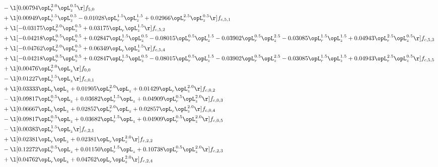 \begin{alignat}{2}
& - \l[  0.00794 \opL_r^{2.0} \opL_z^{0.5}  \r] f_{5,0} \nonumber \\ 
& + \l[  0.00949 \opL_r^{1.5} \opL_z^{0.5}   -0.01028 \opL_r^{1.5} \opL_z^{1.5} +  0.02966 \opL_r^{2.5} \opL_z^{0.5}  \r] f_{c,5,1} \nonumber \\ 
& + \l[  -0.03175 \opL_r^{2.0} \opL_z^{0.5} +  0.03175 \opL_r \opL_z^{1.5}  \r] f_{c,5,2} \nonumber \\ 
& + \l[  -0.04218 \opL_r^{0.5} \opL_z^{0.5} +  0.02847 \opL_r^{1.5} \opL_z^{0.5}   -0.08015 \opL_r^{0.5} \opL_z^{1.5}   -0.03902 \opL_r^{0.5} \opL_z^{2.5}   -0.03085 \opL_r^{1.5} \opL_z^{1.5} +  0.04943 \opL_r^{2.5} \opL_z^{0.5}  \r] f_{c,5,3} \nonumber \\ 
& + \l[  -0.04762 \opL_r^{2.0} \opL_z^{0.5} +  0.06349 \opL_r \opL_z^{1.5}  \r] f_{c,5,4} \nonumber \\ 
& + \l[  -0.04218 \opL_r^{0.5} \opL_z^{0.5} +  0.02847 \opL_r^{1.5} \opL_z^{0.5}   -0.08015 \opL_r^{0.5} \opL_z^{1.5}   -0.03902 \opL_r^{0.5} \opL_z^{2.5}   -0.03085 \opL_r^{1.5} \opL_z^{1.5} +  0.04943 \opL_r^{2.5} \opL_z^{0.5}  \r] f_{c,5,5} \nonumber \\ 
& + \l[  0.00476 \opL_r^{2.0} \opL_z  \r] f_{0,0} \nonumber \\ 
& - \l[  0.01227 \opL_r^{1.5} \opL_z  \r] f_{c,0,1} \nonumber \\ 
& + \l[  0.03333 \opL_r \opL_z +  0.01905 \opL_r^{2.0} \opL_z +  0.01429 \opL_r \opL_z^{2.0}  \r] f_{c,0,2} \nonumber \\ 
& - \l[  0.09817 \opL_r^{0.5} \opL_z +  0.03682 \opL_r^{1.5} \opL_z +  0.04909 \opL_r^{0.5} \opL_z^{2.0}  \r] f_{c,0,3} \nonumber \\ 
& + \l[  0.06667 \opL_r \opL_z +  0.02857 \opL_r^{2.0} \opL_z +  0.02857 \opL_r \opL_z^{2.0}  \r] f_{c,0,4} \nonumber \\ 
& - \l[  0.09817 \opL_r^{0.5} \opL_z +  0.03682 \opL_r^{1.5} \opL_z +  0.04909 \opL_r^{0.5} \opL_z^{2.0}  \r] f_{c,0,5} \nonumber \\ 
& - \l[  0.00383 \opL_r^{1.5} \opL_z  \r] f_{c,2,1} \nonumber \\ 
& + \l[  0.02381 \opL_r \opL_z +  0.02381 \opL_r \opL_z^{2.0}  \r] f_{c,2,2} \nonumber \\ 
& - \l[  0.12272 \opL_r^{0.5} \opL_z +  0.01150 \opL_r^{1.5} \opL_z +  0.10738 \opL_r^{0.5} \opL_z^{2.0}  \r] f_{c,2,3} \nonumber \\ 
& + \l[  0.04762 \opL_r \opL_z +  0.04762 \opL_r \opL_z^{2.0}  \r] f_{c,2,4} \nonumber \\ 

\end{alignat}
